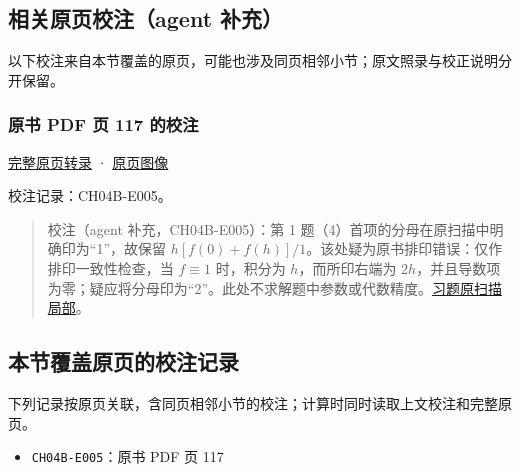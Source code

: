 \documentclass[
  10pt,
  fontset=fandol]{ctexart}
\providecommand{\tightlist}{%
  \setlength{\itemsep}{0pt}\setlength{\parskip}{0pt}}
\begin{document}
\subsection{相关原页校注（agent 补充）}\label{ux76f8ux5173ux539fux9875ux6821ux6ce8agent-ux8865ux5145}

以下校注来自本节覆盖的原页，可能也涉及同页相邻小节；原文照录与校正说明分开保留。

\subsubsection{原书 PDF 页 117 的校注}\label{ux539fux4e66-pdf-ux9875-117-ux7684ux6821ux6ce8}

\href{../pages/pdf-117.md}{完整原页转录} · \href{../../source-images/pdf-117.jpeg}{原页图像}

校注记录：CH04B-E005。

\begin{quote}
校注（agent 补充，CH04B-E005）：第 1 题（4）首项的分母在原扫描中明确印为``1''，故保留 \(h[f(0)+f(h)]/1\)。该处疑为原书排印错误：仅作排印一致性检查，当 \(f\equiv1\) 时，积分为 \(h\)，而所印右端为 \(2h\)，并且导数项为零；疑应将分母印为``2''。此处不求解题中参数或代数精度。\href{../assets/ch04b/review-p117-exercises.png}{习题原扫描局部}。
\end{quote}

\subsection{本节覆盖原页的校注记录}\label{ux672cux8282ux8986ux76d6ux539fux9875ux7684ux6821ux6ce8ux8bb0ux5f55}

下列记录按原页关联，含同页相邻小节的校注；计算时同时读取上文校注和完整原页。

\begin{itemize}
\tightlist
\item
  \texttt{CH04B-E005}：原书 PDF 页 117
\end{itemize}
\end{document}
